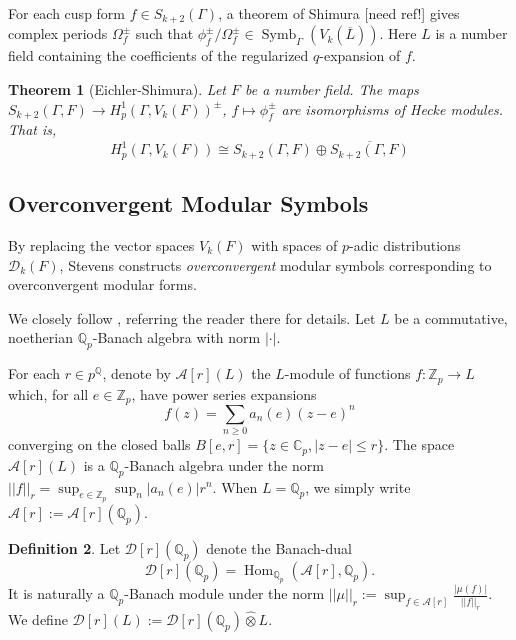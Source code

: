 \documentclass[10pt]{amsart}
\theoremstyle{plain}
\newtheorem{theorem}{Theorem}[section]
\theoremstyle{definition}
\newtheorem{definition}[theorem]{Definition}
\newcommand{\ZZ}{{\mathbb{Z}}}
\newcommand{\CC}{{\mathbb{C}}}
\newcommand{\QQ}{{\mathbb{Q}}}
\newcommand{\cA}{\mathcal{A}}
\newcommand{\cD}{\mathcal{D}}
\DeclareMathOperator{\Hom}{Hom}
\DeclareMathOperator{\Symb}{Symb}
\begin{document}
For each cusp form $f\in S_{k+2}(\Gamma)$, a theorem of Shimura [need ref!] gives complex periods $\Omega_f^\pm$ such that $\phi_f^\pm/\Omega_f^\pm \in \Symb_\Gamma(V_k(\overline{L}))$. Here $L$ is a number field containing the coefficients of the regularized $q$-expansion of $f$.
\begin{theorem}[Eichler-Shimura]
Let $F$ be a number field. The maps $S_{k+2}(\Gamma,F)\longrightarrow H^1_p(\Gamma, V_k(F))^\pm$, $f\mapsto \phi_{f}^\pm$ are isomorphisms of Hecke modules. That is,
\begin{equation*}
	H^1_p(\Gamma, V_k(F)) \cong S_{k+2}(\Gamma,F)\oplus \overline{S_{k+2}(\Gamma,F)}
\end{equation*}
\end{theorem}

\subsection{Overconvergent Modular Symbols}
By replacing the vector spaces $V_k(F)$ with spaces of $p$-adic distributions $\cD_k(F)$, Stevens \cite{Stevens} constructs \emph{overconvergent} modular symbols corresponding to  overconvergent modular forms.

We closely follow \cite{Bellaiche}, referring the reader there for details. Let $L$ be a commutative, noetherian $\QQ_p$-Banach algebra with norm $|\cdot |$. 

For each $r\in p^\QQ$, denote by $\cA[r](L)$ the $L$-module of functions $f:\ZZ_p\rightarrow L$ which, for all $e\in\ZZ_p$,  have power series expansions 
\begin{equation*}
	f(z) = \sum_{n \geq 0 } a_n(e) (z-e)^n
\end{equation*}
converging on the closed balls $B[e,r] = \{z \in \CC_p, |z-e| \leq r\}$. The space $\cA[r](L)$ is a $\QQ_p$-Banach algebra under the norm $||f ||_r = \sup_{e\in\ZZ_p} \sup_n |a_n(e)|r^n$. When $L=\QQ_p$, we simply write $\cA[r]:=\cA[r](\QQ_p)$.



\begin{definition}
Let $\cD[r](\QQ_p)$ denote the Banach-dual
\begin{equation}
	\cD[r](\QQ_p) = \Hom_{\QQ_p}(\cA[r],\QQ_p).
\end{equation}
It is naturally a $\QQ_p$-Banach module under the norm $||\mu||_r := \sup_{f\in \cA[r]} \frac{ |\mu(f)|}{||f||_r}$. We define $\cD[r](L) :=\cD[r](\QQ_p) \widehat{\otimes} L$.
\end{definition}
\end{document}
